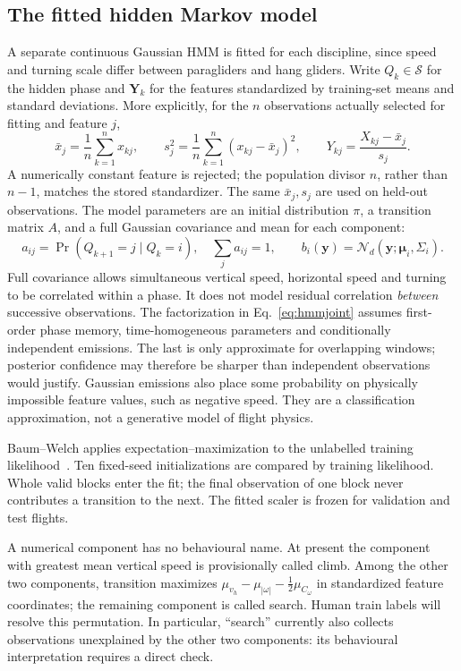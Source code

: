 \subsection{The fitted hidden Markov model}
\label{sec:hmminference}
A separate continuous Gaussian HMM is fitted for each discipline, since speed and turning
scale differ between paragliders and hang gliders. Write $Q_k\in\mathcal S$ for the
hidden phase and $\mathbf Y_k$ for the features standardized by training-set means and
standard deviations. More explicitly, for the $n$ observations actually selected for
fitting and feature $j$,
\begin{equation}
 \bar x_j=\frac1n\sum_{k=1}^n x_{kj},\qquad
 s_j^2=\frac1n\sum_{k=1}^n(x_{kj}-\bar x_j)^2,\qquad
 Y_{kj}=\frac{X_{kj}-\bar x_j}{s_j}.
 \label{eq:phase-standardization}
\end{equation}
A numerically constant feature is rejected; the population divisor $n$, rather than
$n-1$, matches the stored standardizer. The same $\bar x_j,s_j$ are used on held-out
observations. The model parameters are an initial distribution $\pi$, a transition
matrix $A$, and a full Gaussian covariance and mean for each component:
\begin{equation}
 a_{ij}=\Pr(Q_{k+1}=j\mid Q_k=i),\quad \sum_j a_{ij}=1,
 \qquad
 b_i(\mathbf y)=\mathcal N_d(\mathbf y;\boldsymbol\mu_i,\Sigma_i).
 \label{eq:hmmtransition}
\end{equation}
Full covariance allows simultaneous vertical speed, horizontal speed and turning to be
correlated within a phase. It does not model residual correlation \emph{between}
successive observations. The factorization in Eq.~\eqref{eq:hmmjoint} assumes first-order phase memory,
time-homogeneous parameters and conditionally independent emissions.
The last is only approximate for overlapping windows; posterior confidence may therefore
be sharper than independent observations would justify. Gaussian emissions also place
some probability on physically impossible feature values, such as negative speed.
They are a classification approximation, not a generative model of flight physics.

Baum--Welch applies expectation--maximization to the unlabelled training
likelihood~\cite{baum1970,dempster1977}. Ten fixed-seed initializations
are compared by training likelihood. Whole valid blocks enter the fit; the final
observation of one block never contributes a transition to the next. The fitted scaler
is frozen for validation and test flights.

A numerical component has no behavioural name. At present the component with greatest
mean vertical speed is provisionally called climb. Among the other two components,
transition maximizes $\mu_{v_h}-\mu_{|\omega|}-\tfrac12\mu_{C_\omega}$
in standardized feature coordinates; the remaining component is called search. Human train labels will resolve this
permutation. In particular, ``search'' currently also collects observations unexplained
by the other two components: its behavioural interpretation requires a direct check.


